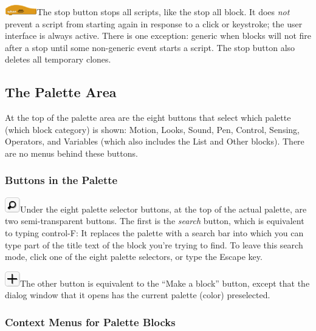 \includegraphics[width=0.54861in,height=0.17708in]{media/image1048.png}The
stop button stops all scripts, like the stop all block. It does
\emph{not} prevent a script from starting again in response to a click
or keystroke; the user interface is always active. There is one
exception: generic when blocks will not fire after a stop until some
non-generic event starts a script. The stop button also deletes all
temporary clones.

\subsection{\texorpdfstring{\hfill\break
The Palette Area}{ The Palette Area}}\label{the-palette-area}

At the top of the palette area are the eight buttons that select which
palette (which block category) is shown: Motion, Looks, Sound, Pen,
Control, Sensing, Operators, and Variables (which also includes the List
and Other blocks). There are no menus behind these buttons.

\subsubsection{Buttons in the Palette}\label{buttons-in-the-palette}

\includegraphics[width=0.26042in,height=0.26042in]{media/image1049.png}Under
the eight palette selector buttons, at the top of the actual palette,
are two semi-transparent buttons. The first is the \emph{search} button,
which is equivalent to typing control-F: It replaces the palette with a
search bar into which you can type part of the title text of the block
you're trying to find. To leave this search mode, click one of the eight
palette selectors, or type the Escape key.

\includegraphics[width=0.26042in,height=0.26042in]{media/image1050.png}The
other button is equivalent to the ``Make a block'' button, except that
the dialog window that it opens has the current palette (color)
preselected.

\subsubsection{Context Menus for Palette
Blocks}\label{context-menus-for-palette-blocks}

